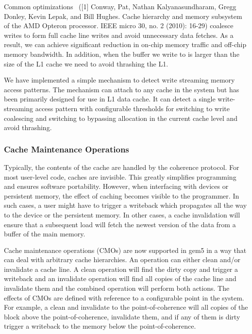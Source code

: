 Common optimizations~\cite{} ([1] Conway, Pat, Nathan Kalyanasundharam, Gregg Donley, Kevin Lepak, and Bill Hughes. Cache hierarchy and memory subsystem of the AMD Opteron processor. IEEE micro 30, no. 2 (2010): 16-29) coalesce writes to form full cache line writes and avoid unnecessary data fetches.
As a result, we can achieve significant reduction in on-chip memory traffic and off-chip memory bandwidth.
In addition, when the buffer we write to is larger than the size of the L1 cache we need to avoid thrashing the L1.

We have implemented a simple mechanism to detect write streaming memory access patterns.
The mechanism can attach to any cache in the system but has been primarily designed for use in L1 data cache.
It can detect a single write-streaming access pattern with configurable thresholds for switching to write coalescing and switching to bypassing allocation in the current cache level and avoid thrashing.

\subsubsection[Cache Maintenance Operations]{Cache Maintenance Operations}

Typically, the contents of the cache are handled by the coherence protocol.
For most user-level code, caches are invisible.
This greatly simplifies programming and ensures software portability.
However, when interfacing with devices or persistent memory, the effect of caching becomes visible to the programmer.
In such cases, a user might have to trigger a writeback which propagates all the way to the device or the persistent memory.
In other cases, a cache invalidation will ensure that a subsequent load will fetch the newest version of the data from a buffer of the main memory.

Cache maintenance operations (CMOs) are now supported in gem5 in a way that can deal with arbitrary cache hierarchies.
An operation can either clean and/or invalidate a cache line.
A clean
operation will find the dirty copy and trigger a writeback and an invalidate operation will find all copies of the cache line and invalidate them and the combined operation will perform both actions.
The effects of CMOs are defined with reference to a configurable point in the system.
For example, a clean and invalidate to the point-of-coherence will all copies of the block above the point-of-coherence, invalidate them, and if any of them is dirty trigger a writeback to the memory below the point-of-coherence.

